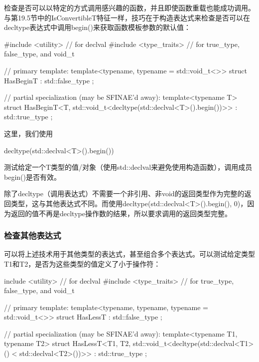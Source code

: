 检查是否可以以特定的方式调用感兴趣的函数，并且即使函数重载也能成功调用。与第19.5节中的IsConvertibleT特征一样，技巧在于构造表达式来检查是否可以在decltype表达式中调用begin()来获取函数模板参数的默认值：

\begin{cpp}
#include <utility> // for declval
#include <type_traits> // for true_type, false_type, and void_t

// primary template:
template<typename, typename = std::void_t<>>
struct HasBeginT : std::false_type {
};

// partial specialization (may be SFINAE'd away):
template<typename T>
struct HasBeginT<T, std::void_t<decltype(std::declval<T>().begin())>>
: std::true_type {
};
\end{cpp}

这里，我们使用

\begin{cpp}
decltype(std::declval<T>().begin())
\end{cpp}

测试给定一个T类型的值/对象（使用std::declval来避免使用构造函数），调用成员begin()是否有效。

\begin{notice}
除了decltype（调用表达式）不需要一个非引用、非void的返回类型作为完整的返回类型，这与其他表达式不同。而使用decltype(std::declval<T>().begin(), 0)，因为返回的值不再是decltype操作数的结果，所以要求调用的返回类型完整。
\end{notice}

\subsubsection{检查其他表达式}

可以将上述技术用于其他类型的表达式，甚至组合多个表达式。可以测试给定类型T1和T2，是否为这些类型的值定义了小于操作符：

\begin{cpp}
include <utility> // for declval
#include <type_traits> // for true_type, false_type, and void_t

// primary template:
template<typename, typename, typename = std::void_t<>>
struct HasLessT : std::false_type
{
};

// partial specialization (may be SFINAE'd away):
template<typename T1, typename T2>
struct HasLessT<T1, T2, std::void_t<decltype(std::declval<T1>()
					< std::declval<T2>())>>
: std::true_type
{
};
\end{cpp}


